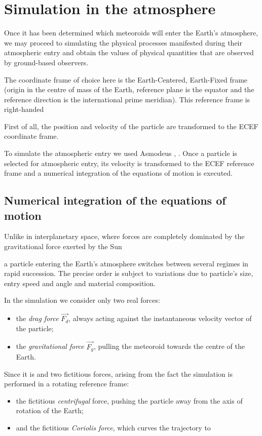 \section{Simulation in the atmosphere} \label{aa}
    Once it has been determined which meteoroids will enter the Earth's atmosphere, we may proceed to simulating
    the physical processes manifested during their atmospheric entry and obtain the values of physical quantities
    that are observed by ground-based observers.

    The coordinate frame of choice here is the Earth-Centered, Earth-Fixed frame (origin in the centre of mass of the Earth,
    reference plane is the equator and the reference direction is the international prime meridian).
    This reference frame is right-handed

    First of all, the position and velocity of the particle are transformed to the ECEF coordinate frame.

    To simulate the atmospheric entry we used Asmodeus \citep{balaz-thesis}, \citep{balaz+2020}.
    Once a particle is selected for atmospheric entry, its velocity is transformed to the ECEF reference frame
    and a numerical integration of the equations of motion is executed.

    \subsection{Numerical integration of the equations of motion} \label{aai}
        Unlike in interplanetary space, where forces are completely dominated by the gravitational force
        exerted by the Sun

        a particle entering the Earth's atmosphere switches between several regimes in rapid succession.
        The precise order is subject to variations due to particle's size, entry speed and angle
        and material composition.


        In the simulation we consider only two real forces:
        \begin{itemize}
            \item the \emph{drag force} $\vec{F_d}$, always acting against the instantaneous velocity vector of the particle;
            \item the \emph{gravitational force} $\vec{F_g}$, pulling the meteoroid towards the centre of the Earth.
        \end{itemize}

        Since it is 
        and two fictitious forces, arising from the fact the simulation is performed in a rotating reference frame:
        \begin{itemize}
            \item the fictitious \emph{centrifugal} force, pushing the particle away from the axis of rotation of the Earth;
            \item and the fictitious \emph{Coriolis force}, which curves the trajectory to
        \end{itemize}

